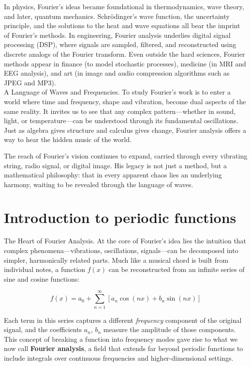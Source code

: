 \documentclass{book}
\begin{document}
In physics, Fourier’s ideas became foundational in thermodynamics, wave theory, and later, quantum mechanics. Schrödinger’s wave function, the uncertainty principle, and the solutions to the heat and wave equations all bear the imprint of Fourier’s methods. In engineering, Fourier analysis underlies digital signal processing (DSP), where signals are sampled, filtered, and reconstructed using discrete analogs of the Fourier transform. Even outside the hard sciences, Fourier methods appear in finance (to model stochastic processes), medicine (in MRI and EEG analysis), and art (in image and audio compression algorithms such as JPEG and MP3).\\

A Language of Waves and Frequencies. To study Fourier’s work is to enter a world where time and frequency, shape and vibration, become dual aspects of the same reality. It invites us to see that any complex pattern---whether in sound, light, or temperature---can be understood through its fundamental oscillations. Just as algebra gives structure and calculus gives change, Fourier analysis offers a way to hear the hidden music of the world.

The reach of Fourier’s vision continues to expand, carried through every vibrating string, radio signal, or digital image. His legacy is not just a method, but a mathematical philosophy: that in every apparent chaos lies an underlying harmony, waiting to be revealed through the language of waves.

\section{Introduction to periodic functions}


The Heart of Fourier Analysis. At the core of Fourier’s idea lies the intuition that complex phenomena---vibrations, oscillations, signals---can be decomposed into simpler, harmonically related parts. Much like a musical chord is built from individual notes, a function $f(x)$ can be reconstructed from an infinite series of sine and cosine functions:

\[
f(x) = a_0 + \sum_{n=1}^{\infty} \left[ a_n \cos(nx) + b_n \sin(nx) \right]
\]

Each term in this series captures a different \emph{frequency} component of the original signal, and the coefficients $a_n$, $b_n$ measure the amplitude of those components. This concept of breaking a function into frequency modes gave rise to what we now call \textbf{Fourier analysis}, a field that extends far beyond periodic functions to include integrals over continuous frequencies and higher-dimensional settings.\\
\end{document}
